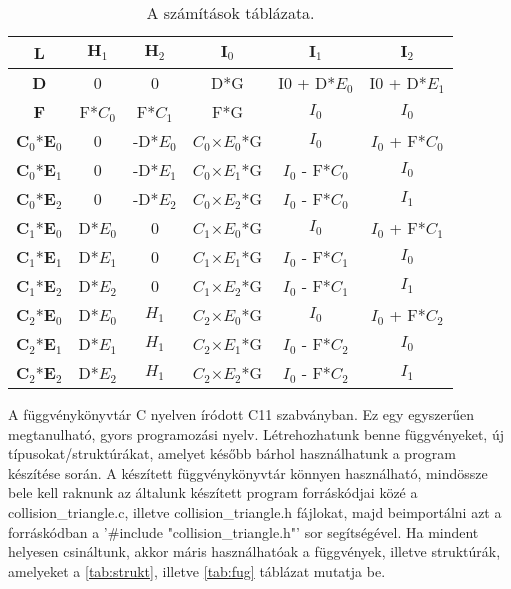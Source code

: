 \begin{table}
	\centering
	
	\begin{tabular}{|c||c|c|c|c|c|}
		\hline
		\textbf{L}     & $\textbf{H}_1$   & $\textbf{H}_2$    & $\textbf{I}_0$      & $\textbf{I}_1$        & $\textbf{I}_2$        \\ \hline
		\textbf{D}     & 0    & 0     & D*G     & I0 + D*$E_0$ & I0 + D*$E_1$ \\ \hline
		\textbf{F}     & F*$C_0$ & F*$C_1$  & F*G     & $I_0$        & $I_0$        \\ \hline
		$\textbf{C}_0$*$\textbf{E}_0$ & 0    & -D*$E_0$ & $C_0$$\times$$E_0$*G & $I_0$        & $I_0$ + F*$C_0$ \\ \hline
		$\textbf{C}_0$*$\textbf{E}_1$ & 0    & -D*$E_1$ & $C_0$$\times$$E_1$*G & $I_0$ - F*$C_0$ & $I_0$        \\ \hline
		$\textbf{C}_0$*$\textbf{E}_2$ & 0    & -D*$E_2$ & $C_0$$\times$$E_2$*G & $I_0$ - F*$C_0$ & $I_1$        \\ \hline
		$\textbf{C}_1$*$\textbf{E}_0$ & D*$E_0$ & 0     & $C_1$$\times$$E_0$*G & $I_0$        & $I_0$ + F*$C_1$ \\ \hline
		$\textbf{C}_1$*$\textbf{E}_1$ & D*$E_1$ & 0     & $C_1$$\times$$E_1$*G & $I_0$ - F*$C_1$ & $I_0$        \\ \hline
		$\textbf{C}_1$*$\textbf{E}_2$ & D*$E_2$ & 0     & $C_1$$\times$$E_2$*G & $I_0$ - F*$C_1$ & $I_1$        \\ \hline
		$\textbf{C}_2$*$\textbf{E}_0$ & D*$E_0$ & $H_1$    & $C_2$$\times$$E_0$*G & $I_0$        & $I_0$ + F*$C_2$ \\ \hline
		$\textbf{C}_2$*$\textbf{E}_1$ & D*$E_1$ & $H_1$    & $C_2$$\times$$E_1$*G & $I_0$ - F*$C_2$ & $I_0$        \\ \hline
		$\textbf{C}_2$*$\textbf{E}_2$ & D*$E_2$ & $H_1$   & $C_2$$\times$$E_2$*G & $I_0$ - F*$C_2$ & $I_1$        \\ \hline
	\end{tabular}
	\caption{A számítások táblázata.}
	\label{tab:szamitas}
\end{table}

\newpage

A függvénykönyvtár C nyelven \cite{C} íródott C11 szabványban. Ez egy egyszerűen megtanulható, gyors programozási nyelv. Létrehozhatunk benne függvényeket, új típusokat/struktúrákat, amelyet később bárhol használhatunk a program készítése során. A készített függvénykönyvtár könnyen használható, mindössze bele kell raknunk az általunk készített program forráskódjai közé a collision\_triangle.c, illetve collision\_triangle.h fájlokat, majd beimportálni azt a forráskódban a '\#include "collision\_triangle.h"' sor segítségével. Ha mindent helyesen csináltunk, akkor máris használhatóak a függvények, illetve struktúrák, amelyeket a \ref{tab:strukt}, illetve \ref{tab:fug} táblázat mutatja be.



